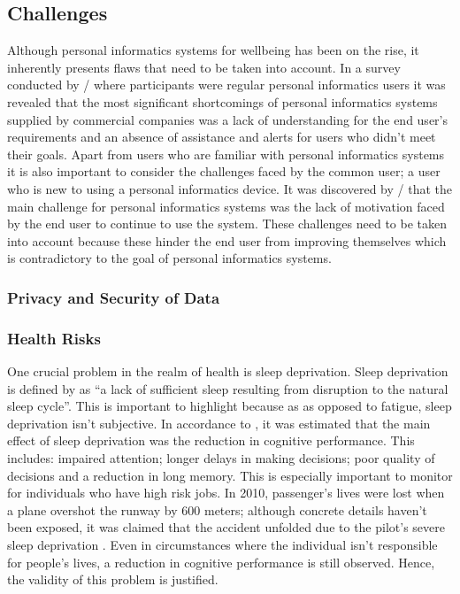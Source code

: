 \subsection{Challenges}
Although personal informatics systems for wellbeing has been on the rise, it inherently presents flaws that need to
be taken into account. In a survey conducted by / where participants were regular personal informatics users it was revealed
that the most significant shortcomings of personal informatics systems supplied by commercial companies was a lack of understanding
for the end user's requirements and an absence of assistance and alerts for users who didn't meet their goals.
Apart from users who are familiar with personal informatics systems it is also important to consider the challenges
faced by the common user; a user who is new to using a personal informatics device. It was discovered by / that the main
challenge for personal informatics systems was the lack of motivation faced by the end user to continue to use the system.
These challenges need to be taken into account because these hinder the end user from improving themselves which is contradictory
to the goal of personal informatics systems.

\subsubsection{Privacy and Security of Data}



\subsubsection{Health Risks}

One crucial problem in the realm of health is sleep deprivation. Sleep deprivation is defined by
\textcite{BMA:2018aa} as ``a lack of sufficient sleep resulting from disruption to the natural sleep
cycle''. This is important to highlight because as as opposed to fatigue, sleep deprivation isn't
subjective. In accordance to \textcite{Alhola:2007aa}, it was estimated that the main effect of
sleep deprivation was the reduction in cognitive performance. This includes: impaired attention;
longer delays in making decisions; poor quality of decisions and a reduction in long memory. This is
especially important to monitor for individuals who have high risk jobs. In 2010, passenger's lives
were lost when a plane overshot the runway by 600 meters; although concrete details haven't been
exposed, it was claimed that the accident unfolded due to the pilot's severe sleep deprivation
\parencite{BBC:2010aa}. Even in circumstances where the individual isn't responsible for people's
lives, a reduction in cognitive performance is still observed. Hence, the validity of this problem
is justified.

